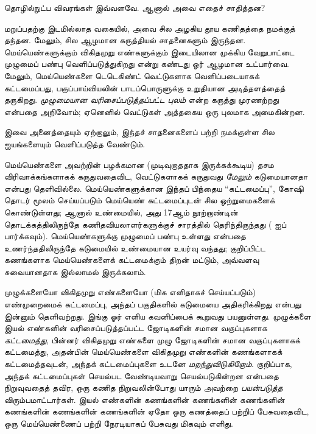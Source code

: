 \documentclass[../../../include/open-logic-section]{subfiles}
\begin{document}

தொழில்நுட்ப விவரங்கள் இவ்வளவே. ஆனால் அவை எதைச் சாதித்தன?

மறுப்பதற்கு இடமில்லாத வகையில், அவை சில {அழகிய} தூய கணிதத்தை
நமக்குத் தந்தன. மேலும், சில ஆழமான கருத்தியல் சாதனைகளும் இருந்தன.
மெய்யெண்களுக்கும் விகிதமுறு எண்களுக்கும் இடையிலான முக்கிய வேறுபாட்டை
முழுமைப் பண்பு வெளிப்படுத்துகிறது என்று கண்டது ஓர் ஆழமான உட்பார்வை.
மேலும், மெய்யெண்களை டெடெகிண்ட் வெட்டுகளாக வெளிப்படையாகக்
கட்டமைப்பது, பகுப்பாய்வியலின் பாடப்பொருளுக்கு உறுதியான அடித்தளத்தைத்
தருகிறது. \emph{முழுமையான வரிசைப்படுத்தப்பட்ட புலம்} என்ற கருத்து
முரணற்றது என்பதை அறிவோம்; ஏனெனில் வெட்டுகள் அத்தகைய ஒரு புலமாக அமைகின்றன.

இவை அனைத்தையும் ஏற்றாலும், இந்தச் சாதனைகளைப் பற்றி நமக்குள்ள
சில ஐயங்களையும் வெளிப்படுத்த வேண்டும்.

மெய்யெண்களை அவற்றின் பழக்கமான (முடிவுறாததாக இருக்கக்கூடிய)
தசம விரிவாக்கங்களாகக் கருதுவதைவிட, வெட்டுகளாகக் கருதுவது
\emph{மேலும்} கடுமையானதா என்பது தெளிவில்லை.
மெய்யெண்களுக்கான இந்தப் பிந்தைய ``கட்டமைப்பு'',
கோஷி தொடர் மூலம் செய்யப்படும் மெய்யெண் கட்டமைப்புடன் சில ஒற்றுமைகளைக்
கொண்டுள்ளது; ஆனால் உண்மையில், அது 17ஆம் நூற்றாண்டின் தொடக்கத்திலிருந்தே
கணிதவியலாளர்களுக்குச் சாரத்தில் தெரிந்திருந்தது
( ஐப் பார்க்கவும்).
மெய்யெண்களுக்கு முழுமைப் பண்பு உள்ளது என்பதை உணர்ந்ததிலிருந்தே
கடுமையில் உண்மையான உயர்வு வந்தது;
குறிப்பிட்ட கணங்களாக மெய்யெண்களைக் கட்டமைக்கும் திறன் மட்டும்,
அவ்வளவு சுவையானதாக இல்லாமல் இருக்கலாம்.

முழுக்களையோ விகிதமுறு எண்களையோ (மிக எளிதாகச் செய்யப்படும்)
எண்முறைமைக் கட்டமைப்பு, அந்தப் பகுதிகளில் கடுமையை அதிகரிக்கிறது
என்பது இன்னும் தெளிவற்றது.
இங்கு ஓர் எளிய கவனிப்பைக் கூறுவது பயனுள்ளது.
முழுக்களை இயல் எண்களின் வரிசைப்படுத்தப்பட்ட ஜோடிகளின் சமான
வகுப்புகளாக \emph{கட்டமைத்து}, பின்னர் விகிதமுறு எண்களை முழு ஜோடிகளின்
சமான வகுப்புகளாகக் கட்டமைத்து, அதன்பின் மெய்யெண்களை விகிதமுறு எண்களின்
கணங்களாகக் கட்டமைத்தவுடன், அந்தக் கட்டமைப்புகளை உடனே
\emph{மறந்துவிடுகிறோம்}.
குறிப்பாக, அந்தக் கட்டமைப்புகள் செயல்பட வேண்டியவாறு செயல்படுகின்றன
என்பதை நிறுவுவதைத் தவிர, ஒரு கணித நிறுவலின்போது யாரும் அவற்றை
\emph{பயன்படுத்த} விரும்பமாட்டார்கள்.
இயல் எண்களின் கணங்களின் கணங்களின் கணங்களின் கணங்களின் கணங்களின்
கணங்களின் ஏதோ ஒரு கணத்தைப் பற்றிப் பேசுவதைவிட,
ஒரு மெய்யெண்ணைப் பற்றி நேரடியாகப் பேசுவது மிகவும் எளிது.
%
%
%
	
\end{document}
